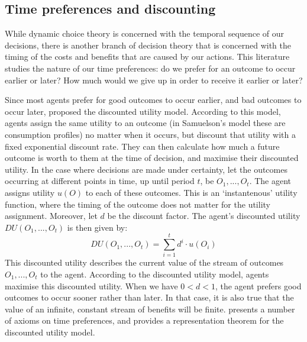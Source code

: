 \subsection{Time preferences and discounting}\label{subs72}

While dynamic choice theory is concerned with the temporal sequence of our decisions, there is another branch of decision theory that is concerned with the timing of the costs and benefits that are caused by our actions. This literature studies the nature of our time preferences: do we prefer for an outcome to occur earlier or later? How much would we give up in order to receive it earlier or later?

Since most agents prefer for good outcomes to occur earlier, and bad outcomes to occur later, \citet{Samuelson1937} proposed the discounted utility model. According to this model, agents assign the same utility to an outcome (in Samuelson's model these are consumption profiles) no matter when it occurs, but discount that utility with a fixed exponential discount rate. They can then calculate how much a future outcome is worth to them at the time of decision, and maximise their discounted utility. In the case where decisions are made under certainty, let the outcomes occurring at different points in time, up until period $t$, be $O_1, ..., O_t$. The agent assigns utility $u(O)$ to each of these outcomes. This is an `instantenous' utility function, where the timing of the outcome does not matter for the utility assignment. Moreover, let $d$ be the discount factor. The agent's discounted utility $DU(O_1, ..., O_t)$ is then given by:
$$DU(O_1, ..., O_t) = \sum\limits_{i=1}^t d^i \cdot u (O_{i})$$
This discounted utility describes the current value of the stream of outcomes $O_1, ..., O_t$ to the agent. According to the discounted utility model, agents maximise this discounted utility. When we have $0 < d < 1$, the agent prefers good outcomes to occur sooner rather than later. In that case, it is also true that the value of an infinite, constant stream of benefits will be finite. \citet{Koopmans1960} presents a number of axioms on time preferences, and provides a representation theorem for the discounted utility model.

